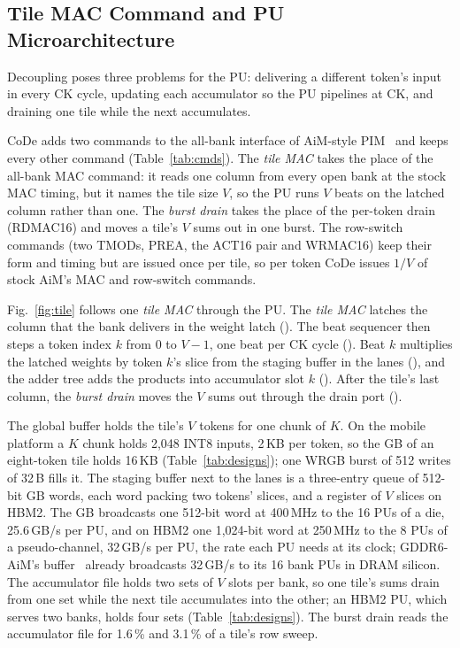\subsection{Tile MAC Command and PU Microarchitecture}
\label{sec:design:pu}

Decoupling poses three problems for the PU: delivering a different token's input in every CK cycle, updating
each accumulator so the PU pipelines at CK, and draining one tile while the next accumulates.

CoDe adds two commands to the all-bank interface of AiM-style PIM~\cite{aimjssc} and keeps every other command
(Table~\ref{tab:cmds}). The \emph{tile MAC} takes the place of the all-bank MAC command: it reads one column from every
open bank at the stock MAC timing, but it names the tile size $V$, so the PU runs $V$ beats on the latched column
rather than one. The \emph{burst drain} takes the place of the per-token drain (RDMAC16) and moves a tile's $V$ sums
out in one burst. The row-switch commands (two TMODs, PREA, the ACT16 pair and WRMAC16) keep their form and timing but
are issued once per tile, so per token CoDe issues $1/V$ of stock AiM's MAC and row-switch commands.


Fig.~\ref{fig:tile} follows one \emph{tile MAC} through the PU. The \emph{tile MAC} latches the column that the bank delivers in the
weight latch (). The beat sequencer then steps a token index $k$ from 0 to $V-1$, one beat per CK cycle
(). Beat $k$ multiplies the latched weights by token $k$'s slice from the staging buffer in the lanes (), and the adder
tree adds the products into accumulator slot $k$ (). After the tile's last column, the \emph{burst drain} moves the
$V$ sums out through the drain port ().

The global buffer holds the tile's $V$ tokens for one chunk of $K$. On the mobile platform a $K$ chunk holds 2,048 INT8
inputs, 2\,KB per token, so the GB of an eight-token tile holds 16\,KB (Table~\ref{tab:designs}); one WRGB burst of 512
writes of 32\,B fills it. The staging buffer next to the lanes is a three-entry queue of 512-bit GB words, each word
packing two tokens' slices, and a register of $V$ slices on HBM2. The GB broadcasts one 512-bit word at 400\,MHz to the
16 PUs of a die, 25.6\,GB/s per PU, and on HBM2 one 1,024-bit word at 250\,MHz to the 8 PUs of a pseudo-channel,
32\,GB/s per PU, the rate each PU needs at its clock; GDDR6-AiM's buffer~\cite{aimjssc} already broadcasts 32\,GB/s to its
16 bank PUs in DRAM silicon. The accumulator file holds two sets of $V$ slots per bank, so
one tile's sums drain from one set while the next tile accumulates into the other; an HBM2 PU, which serves two banks,
holds four sets (Table~\ref{tab:designs}). The burst drain reads the accumulator file for 1.6\,\% and 3.1\,\% of a tile's
row sweep.

